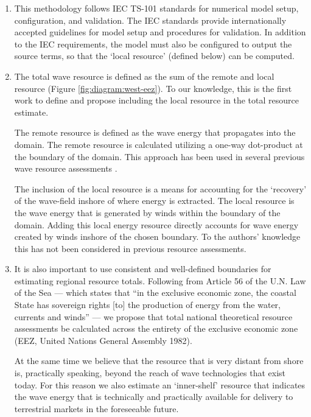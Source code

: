 \begin{enumerate}
    \item This methodology follows IEC TS-101 standards for numerical model setup, configuration, and validation. The IEC standards provide internationally accepted guidelines for model setup and procedures for validation. In addition to the IEC requirements, the model must also be configured to output the source terms, so that the `local resource' (defined below) can be computed.
    
    \item The total wave resource is defined as the sum of the remote and local resource (Figure \ref{fig:diagram:west-eez}). To our knowledge, this is the first work to define and propose including the local resource in the total resource estimate.
    
    The remote resource is defined as the wave energy that propagates into the domain. The remote resource is calculated utilizing a one-way dot-product at the boundary of the domain. This approach has been used in several previous wave resource assessments \citep{gunnQuantifyingGlobalWave2012, hemerRevisedAssessmentAustralia2017, regueroGlobalWavePower2015}.
    
     The inclusion of the local resource is a means for accounting for the `recovery' of the wave-field inshore of where energy is extracted. The local resource is the wave energy that is generated by winds within the boundary of the domain. Adding this local energy resource directly accounts for wave energy created by winds inshore of the chosen boundary. To the authors' knowledge this has not been considered in previous resource assessments.

    \item It is also important to use consistent and well-defined boundaries for estimating regional resource totals. Following from Article 56 of the U.N. Law of the Sea — which states that ``in the exclusive economic zone, the coastal State has sovereign rights [to] the production of energy from the water, currents and winds'' — we propose that total national theoretical resource assessments be calculated across the entirety of the exclusive economic zone (EEZ, United Nations General Assembly 1982).
    
    At the same time we believe that the resource that is very distant from shore is, practically speaking, beyond the reach of wave technologies that exist today. For this reason we also estimate an `inner-shelf' resource that indicates the wave energy that is technically and practically available for delivery to terrestrial markets in the foreseeable future. 
\end{enumerate}

